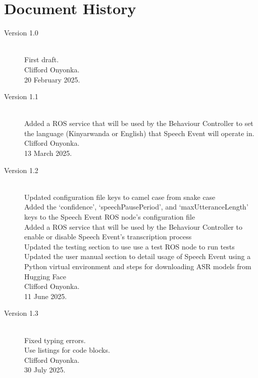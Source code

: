\documentclass{CSSRforAfrica}
\begin{document}
  

\newpage
\section*{Document History}
\label{document_history}

\begin{description}

\item [Version 1.0]~\\
First draft. \\
Clifford Onyonka. \\                                     %
20 February 2025.                                                        %

\item [Version 1.1]~\\
Added a ROS service that will be used by the Behaviour Controller to set the language (Kinyarwanda or English) that Speech Event will operate in. \\
Clifford Onyonka. \\
13 March 2025.

\item [Version 1.2]~\\
Updated configuration file keys to camel case from snake case \\
Added the `confidence', `speechPausePeriod', and `maxUtteranceLength' keys to the Speech Event ROS node's configuration file \\
Added a ROS service that will be used by the Behaviour Controller to enable or disable Speech Event's transcription process \\
Updated the testing section to use use a test ROS node to run tests \\
Updated the user manual section to detail usage of Speech Event using a Python virtual environment and steps for downloading ASR models from Hugging Face \\
Clifford Onyonka. \\
11 June 2025.

\item [Version 1.3]~\\
Fixed typing errors.\\
Use listings for code blocks.\\
Clifford Onyonka. \\
30 July 2025.



\end{description}
\end{document}
